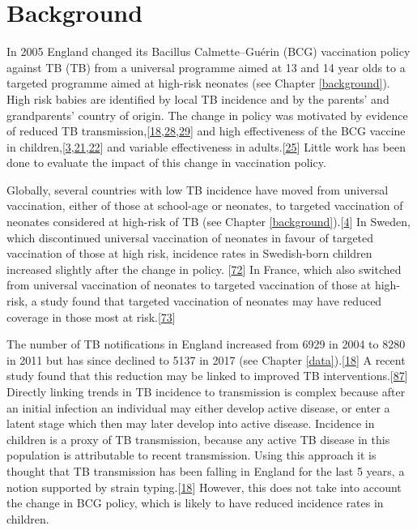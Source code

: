 \documentclass[11pt,twoside]{bristolthesis}
\begin{document}
  \hypertarget{background-5}{%
  \section{Background}\label{background-5}}
  
  In 2005 England changed its Bacillus Calmette--Guérin (BCG) vaccination policy against TB (TB) from a universal programme aimed at 13 and 14 year olds to a targeted programme aimed at high-risk neonates (see Chapter \ref{background}). High risk babies are identified by local TB incidence and by the parents' and grandparents' country of origin. The change in policy was motivated by evidence of reduced TB transmission,{[}\protect\hyperlink{ref-PHE2016a}{18},\protect\hyperlink{ref-Fine2005a}{28},\protect\hyperlink{ref-Teo2006}{29}{]} and high effectiveness of the BCG vaccine in children,{[}\protect\hyperlink{ref-Roy2014}{3},\protect\hyperlink{ref-Rodrigues1993}{21},\protect\hyperlink{ref-Colditz1994}{22}{]} and variable effectiveness in adults.{[}\protect\hyperlink{ref-Zwerling2011}{25}{]} Little work has been done to evaluate the impact of this change in vaccination policy.
  
  Globally, several countries with low TB incidence have moved from universal vaccination, either of those at school-age or neonates, to targeted vaccination of neonates considered at high-risk of TB (see Chapter \ref{background}).{[}\protect\hyperlink{ref-Zwerling2011a}{4}{]} In Sweden, which discontinued universal vaccination of neonates in favour of targeted vaccination of those at high risk, incidence rates in Swedish-born children increased slightly after the change in policy. {[}\protect\hyperlink{ref-Romanus1992}{72}{]} In France, which also switched from universal vaccination of neonates to targeted vaccination of those at high-risk, a study found that targeted vaccination of neonates may have reduced coverage in those most at risk.{[}\protect\hyperlink{ref-Guthmann2011}{73}{]}
  
  The number of TB notifications in England increased from 6929 in 2004 to 8280 in 2011 but has since declined to 5137 in 2017 (see Chapter \ref{data}).{[}\protect\hyperlink{ref-PHE2016a}{18}{]} A recent study found that this reduction may be linked to improved TB interventions.{[}\protect\hyperlink{ref-Thomas2018}{87}{]} Directly linking trends in TB incidence to transmission is complex because after an initial infection an individual may either develop active disease, or enter a latent stage which then may later develop into active disease. Incidence in children is a proxy of TB transmission, because any active TB disease in this population is attributable to recent transmission. Using this approach it is thought that TB transmission has been falling in England for the last 5 years, a notion supported by strain typing.{[}\protect\hyperlink{ref-PHE2016a}{18}{]} However, this does not take into account the change in BCG policy, which is likely to have reduced incidence rates in children.
  
\end{document}
